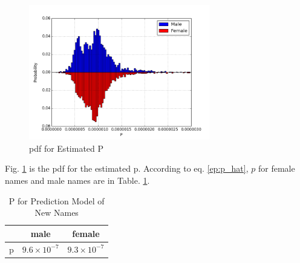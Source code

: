 \documentclass[journal]{IEEEtran}
\begin{document}
\begin{figure}[ht]
	\centering
	\includegraphics[width = 3.1in]{figure/pdf_for_p.png}
	\caption{pdf for Estimated P}
	\label{fig:pdf for Estimated P}
\end{figure}

Fig. \ref{fig:pdf for Estimated P} is the pdf for the estimated p. According to eq. \ref{ep:p_hat}, $p$ for female names and male names are in Table. \ref{Table:P for Prediction Model of New Names}.
\begin{table}[ht]
\centering
\begin{tabular}{c c c}
 \toprule
 &  male  & female\\ 
 \midrule
 p&  $9.6 \times 10^{-7}$  & $9.3 \times 10^{-7}$\\
 \bottomrule
\end{tabular}
\caption{P for Prediction Model of New Names}
\label{Table:P for Prediction Model of New Names}
\end{table}



% 
\end{document}
